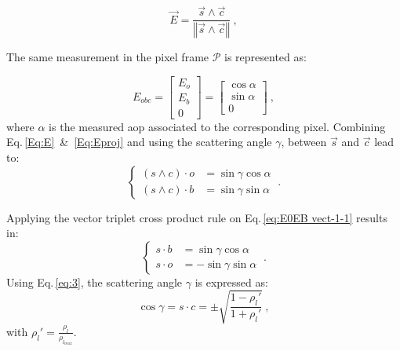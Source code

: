 \begin{equation}
\vec{E}=\frac{\vec{s}\wedge \vec{c}}{\left\Vert \vec{s}\wedge
    \vec{c}\right\Vert } \ ,
\label{Eq:E}
\end{equation}

The same measurement in the pixel frame $\mathcal{P}$ is represented as:

\begin{equation}
E_{obc}=\left[\begin{array}{c}
E_{o}\\
E_{b}\\
0
\end{array}\right]=\left[\begin{array}{c}
\cos\alpha\\
\sin\alpha\\
0
\end{array}\right] \ ,
\label{Eq:Eproj}
\end{equation}
\noindent where $\alpha$ is the measured \gls{aop} associated to the corresponding pixel.
Combining Eq.\,\eqref{Eq:E}~\&~\eqref{Eq:Eproj} and using the
scattering angle $\gamma$, between $\vec{s}$ and $\vec{c}$ lead to:
\begin{equation}
  \begin{cases}
(s\wedge c)\cdot o & =\sin\gamma\cos\alpha\\
(s\wedge c)\cdot b & =\sin\gamma\sin\alpha
\end{cases} \ .
\label{eq:E0EB vect-1-1}
\end{equation}

Applying the vector triplet cross product rule on Eq.\,\eqref{eq:E0EB
  vect-1-1} results in:
\begin{equation}
\begin{cases}
s\cdot b & =\sin\gamma\cos\alpha\\
s\cdot o & =-\sin\gamma\sin\alpha
\end{cases} \ .
\label{eq:scal-b-o}
\end{equation}
Using Eq.\,\eqref{eq:3}, the scattering angle $\gamma$ is expressed as:
\begin{equation}
\cos\gamma=s\cdot c=\pm\sqrt{\frac{1-\rho_{l}'}{1+\rho_{l}'}} \ ,
\label{Eq:cosg}
\end{equation}
\noindent with $\rho_{l}'=\frac{\rho_{l}}{\rho_{l_{max}}}.$ \\
\vspace{0.4mm}

